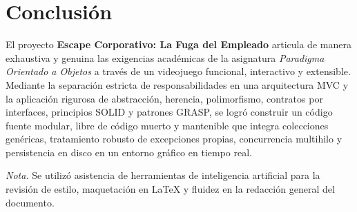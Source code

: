 \documentclass[12pt, a4paper]{article}
\begin{document}
\section{Conclusión}

El proyecto \textbf{Escape Corporativo: La Fuga del Empleado} articula de manera exhaustiva y genuina las exigencias académicas de la asignatura \textit{Paradigma Orientado a Objetos} a través de un videojuego funcional, interactivo y extensible. Mediante la separación estricta de responsabilidades en una arquitectura MVC y la aplicación rigurosa de abstracción, herencia, polimorfismo, contratos por interfaces, principios SOLID y patrones GRASP, se logró construir un código fuente modular, libre de código muerto y mantenible que integra colecciones genéricas, tratamiento robusto de excepciones propias, concurrencia multihilo y persistencia en disco en un entorno gráfico en tiempo real.

\vspace{0.3cm}
\noindent\textit{Nota.} Se utilizó asistencia de herramientas de inteligencia artificial para la revisión de estilo, maquetación en \LaTeX{} y fluidez en la redacción general del documento.
\end{document}
